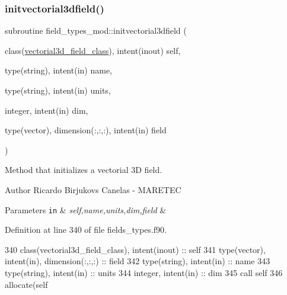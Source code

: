 \subsubsection{\texorpdfstring{initvectorial3dfield()}{initvectorial3dfield()}}
{\footnotesize\ttfamily subroutine field\+\_\+types\+\_\+mod\+::initvectorial3dfield (\begin{DoxyParamCaption}\item[{class(\mbox{\hyperlink{structfield__types__mod_1_1vectorial3d__field__class}{vectorial3d\+\_\+field\+\_\+class}}), intent(inout)}]{self,  }\item[{type(string), intent(in)}]{name,  }\item[{type(string), intent(in)}]{units,  }\item[{integer, intent(in)}]{dim,  }\item[{type(vector), dimension(\+:,\+:,\+:), intent(in)}]{field }\end{DoxyParamCaption})\hspace{0.3cm}{\ttfamily [private]}}



Method that initializes a vectorial 3D field. 

\begin{DoxyAuthor}{Author}
Ricardo Birjukovs Canelas -\/ M\+A\+R\+E\+T\+EC 
\end{DoxyAuthor}

\begin{DoxyParams}[1]{Parameters}
\mbox{\tt in}  & {\em self,name,units,dim,field} & \\
\hline
\end{DoxyParams}


Definition at line 340 of file fields\+\_\+types.\+f90.


\begin{DoxyCode}
340     \textcolor{keywordtype}{class}(vectorial3d\_field\_class), \textcolor{keywordtype}{intent(inout)} :: self
341     \textcolor{keywordtype}{type}(vector), \textcolor{keywordtype}{intent(in)}, \textcolor{keywordtype}{dimension(:,:,:)} :: field
342     \textcolor{keywordtype}{type}(string), \textcolor{keywordtype}{intent(in)} :: name
343     \textcolor{keywordtype}{type}(string), \textcolor{keywordtype}{intent(in)} :: units
344     \textcolor{keywordtype}{integer}, \textcolor{keywordtype}{intent(in)} :: dim
345     \textcolor{keyword}{call }self%
346     \textcolor{keyword}{allocate}(self%
\end{DoxyCode}
\mbox{\label{namespacefield__types__mod_ada2cd66d3baca6f614b2dfb477fc9b3b}} 
